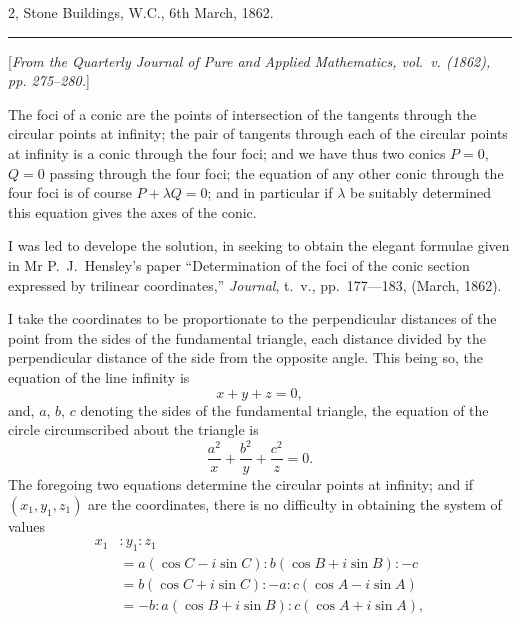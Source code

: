 \documentclass[11pt,a4paper]{book}
\begin{document}
\begin{flushright}
2, Stone Buildings, W.C., 6th March, 1862.
\end{flushright}

\vspace{1.5em}
\hrule
\vspace{1.5em}


{\small
[\textit{From the Quarterly Journal of Pure and Applied Mathematics, vol.~v. (1862), pp. 275--280.}]
\par}
\vspace{0.5em}

\setcounter{page}{505}

The foci of a conic are the points of intersection of the tangents through the circular points at infinity; the pair of tangents through each of the circular points at infinity is a conic through the four foci; and we have thus two conics $P = 0$, $Q = 0$ passing through the four foci; the equation of any other conic through the four foci is of course $P + \lambda Q = 0$; and in particular if $\lambda$ be suitably determined this equation gives the axes of the conic.

I was led to develope the solution, in seeking to obtain the elegant formulae given in Mr P.~J.~Hensley's paper ``Determination of the foci of the conic section expressed by trilinear coordinates,'' \textit{Journal}, t.~v., pp.~177---183, (March, 1862).

I take the coordinates to be proportionate to the perpendicular distances of the point from the sides of the fundamental triangle, each distance divided by the perpendicular distance of the side from the opposite angle. This being so, the equation of the line infinity is
\[
x + y + z = 0,
\]
and, $a$, $b$, $c$ denoting the sides of the fundamental triangle, the equation of the circle circumscribed about the triangle is
\[
\frac{a^2}{x} + \frac{b^2}{y} + \frac{c^2}{z} = 0.
\]
The foregoing two equations determine the circular points at infinity; and if $(x_1, y_1, z_1)$ are the coordinates, there is no difficulty in obtaining the system of values
\begin{align*}
x_1 &: y_1 : z_1\\
&= a(\cos C - i \sin C) : b(\cos B + i \sin B) : -c\\
&= b(\cos C + i \sin C) : -a : c(\cos A - i \sin A)\\
&= -b : a(\cos B + i \sin B) : c(\cos A + i \sin A),
\end{align*}
\end{document}
